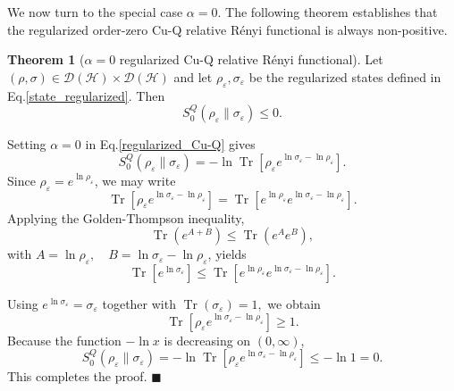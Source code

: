 \documentclass[a4paper, amsfonts, amssymb, amsmath, reprint, showkeys, nofootinbib, twoside, aps, pra]{revtex4-2}
\theoremstyle{definition}
\newtheorem{theorem}{Theorem}
\renewenvironment{proof}{\noindent{\bfseries Proof.}}{\hfill$\blacksquare$}
\begin{document}
We now turn to the special case $\alpha=0$. The following theorem establishes that the regularized order-zero Cu-Q relative Rényi functional is always non-positive.

\begin{theorem}[$\alpha=0$ regularized Cu-Q relative Rényi functional]\label{Th12}
Let $(\rho,\sigma)\in\mathcal D(\mathcal H) \times \mathcal D(\mathcal H)$ and let $\rho_\varepsilon,\sigma_\varepsilon$
be the regularized states defined in Eq.\eqref{state_regularized}.
Then
\begin{equation}
    S_0^Q(\rho_\varepsilon\|\sigma_\varepsilon)
    \le 0.
\end{equation}
\end{theorem}

\begin{proof}
Setting $\alpha=0$ in Eq.\eqref{regularized_Cu-Q}
gives
\begin{equation}
    S_0^Q(\rho_\varepsilon\|\sigma_\varepsilon)=-\ln \operatorname{Tr} \!\left[\rho_\varepsilon e^{\ln\sigma_\varepsilon-\ln\rho_\varepsilon}\right].
\end{equation}
Since
$\rho_\varepsilon=e^{\ln\rho_\varepsilon}$, we may write
\begin{equation}
    \operatorname{Tr}\!\left[\rho_\varepsilon e^{\ln\sigma_\varepsilon-\ln\rho_\varepsilon}
    \right] =\operatorname{Tr}\!\left[e^{\ln\rho_\varepsilon}
    e^{\ln\sigma_\varepsilon-\ln\rho_\varepsilon}\right].
\end{equation}
Applying the Golden-Thompson inequality,
\begin{equation}
    \operatorname{Tr}(e^{A+B})\le \operatorname{Tr}(e^A e^B),
\end{equation}
with $A=\ln\rho_\varepsilon,\quad B=\ln\sigma_\varepsilon-\ln\rho_\varepsilon$,
yields
\begin{equation}
    \operatorname{Tr} \!\left[e^{\ln\sigma_\varepsilon}
    \right] \le\operatorname{Tr}\!\left[
        e^{\ln\rho_\varepsilon}
        e^{\ln\sigma_\varepsilon-\ln\rho_\varepsilon}
    \right].
\end{equation}

Using $e^{\ln\sigma_\varepsilon} = \sigma_\varepsilon$
together with $\operatorname{Tr}(\sigma_\varepsilon)=1,$
we obtain
\begin{equation}
    \operatorname{Tr}\!\left[\rho_\varepsilon
        e^{\ln\sigma_\varepsilon-\ln\rho_\varepsilon}
    \right]\ge 1.
\end{equation}
Because the function $-\ln x$ is decreasing on $(0,\infty)$,
\begin{equation}
    S_0^Q(\rho_\varepsilon\|\sigma_\varepsilon)=-\ln
    \operatorname{Tr}\!\left[\rho_\varepsilon
        e^{\ln\sigma_\varepsilon-\ln\rho_\varepsilon}
    \right] \le-\ln 1=0.
\end{equation}
This completes the proof.
\end{proof}
\end{document}
